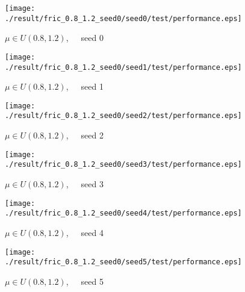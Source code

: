 \begin{figure}[p]
 \begin{minipage}{0.49\hsize}
  \begin{center}
 \texttt{[image: ./result/fric\_0.8\_1.2\_seed0/seed0/test/performance.eps]}
  \caption{$\mu\in U(0.8,1.2)$,~~~seed 0
  }
  \end{center}
 \end{minipage}
 \begin{minipage}{0.49\hsize}
   \begin{center}
 \texttt{[image: ./result/fric\_0.8\_1.2\_seed0/seed1/test/performance.eps]}
  \caption{$\mu\in U(0.8,1.2)$,~~~seed 1
  }
  \end{center}
 \end{minipage}
\end{figure}

\begin{figure}[p]
 \begin{minipage}{0.49\hsize}
  \begin{center}
 \texttt{[image: ./result/fric\_0.8\_1.2\_seed0/seed2/test/performance.eps]}
  \caption{$\mu\in U(0.8,1.2)$,~~~seed 2
  }
  \end{center}
 \end{minipage}
 \begin{minipage}{0.49\hsize}
   \begin{center}
 \texttt{[image: ./result/fric\_0.8\_1.2\_seed0/seed3/test/performance.eps]}
  \caption{$\mu\in U(0.8,1.2)$,~~~seed 3
  }
  \end{center}
 \end{minipage}
\end{figure}

\begin{figure}[p]
 \begin{minipage}{0.49\hsize}
  \begin{center}
 \texttt{[image: ./result/fric\_0.8\_1.2\_seed0/seed4/test/performance.eps]}
  \caption{$\mu\in U(0.8,1.2)$,~~~seed 4
  }
  \end{center}
 \end{minipage}
 \begin{minipage}{0.49\hsize}
   \begin{center}
 \texttt{[image: ./result/fric\_0.8\_1.2\_seed0/seed5/test/performance.eps]}
  \caption{$\mu\in U(0.8,1.2)$,~~~seed 5
  }
  \end{center}
 \end{minipage}
\end{figure}
